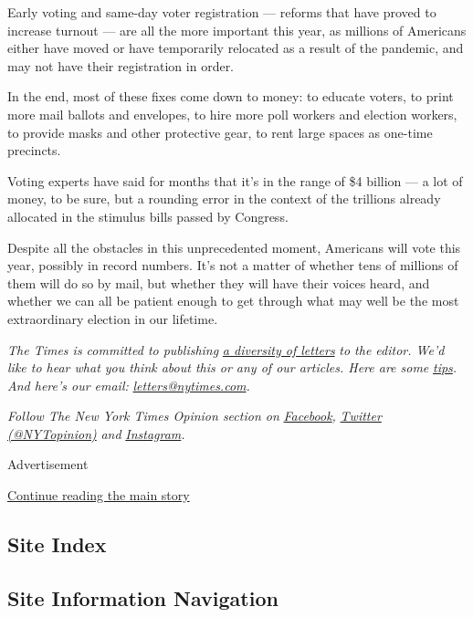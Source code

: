 Early voting and same-day voter registration --- reforms that have
proved to increase turnout --- are all the more important this year, as
millions of Americans either have moved or have temporarily relocated as
a result of the pandemic, and may not have their registration in order.

In the end, most of these fixes come down to money: to educate voters,
to print more mail ballots and envelopes, to hire more poll workers and
election workers, to provide masks and other protective gear, to rent
large spaces as one-time precincts.

Voting experts have said for months that it's in the range of \$4
billion --- a lot of money, to be sure, but a rounding error in the
context of the trillions already allocated in the stimulus bills passed
by Congress.

Despite all the obstacles in this unprecedented moment, Americans will
vote this year, possibly in record numbers. It's not a matter of whether
tens of millions of them will do so by mail, but whether they will have
their voices heard, and whether we can all be patient enough to get
through what may well be the most extraordinary election in our
lifetime.

\emph{The Times is committed to publishing}
\href{https://www.nytimes.com/2019/01/31/opinion/letters/letters-to-editor-new-york-times-women.html}{\emph{a
diversity of letters}} \emph{to the editor. We'd like to hear what you
think about this or any of our articles. Here are some}
\href{https://help.nytimes.com/hc/en-us/articles/115014925288-How-to-submit-a-letter-to-the-editor}{\emph{tips}}\emph{.
And here's our email:}
\href{mailto:letters@nytimes.com}{\emph{letters@nytimes.com}}\emph{.}

\emph{Follow The New York Times Opinion section on}
\href{https://www.facebook.com/nytopinion}{\emph{Facebook}}\emph{,}
\href{http://twitter.com/NYTOpinion}{\emph{Twitter (@NYTopinion)}}
\emph{and}
\href{https://www.instagram.com/nytopinion/}{\emph{Instagram}}\emph{.}

Advertisement

\protect\hyperlink{after-bottom}{Continue reading the main story}

\hypertarget{site-index}{%
\subsection{Site Index}\label{site-index}}

\hypertarget{site-information-navigation}{%
\subsection{Site Information
Navigation}\label{site-information-navigation}}

